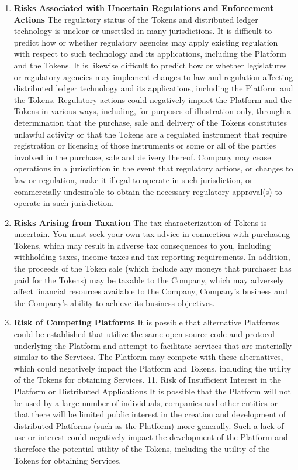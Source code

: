 \begin{enumerate}
    \item \textbf{Risks Associated with Uncertain Regulations and Enforcement Actions}
    The regulatory status of the Tokens and distributed ledger technology is unclear or unsettled in many jurisdictions. It is difficult to predict how or whether regulatory agencies may apply existing regulation with respect to such technology and its applications, including the Platform and the Tokens. It is likewise difficult to predict how or whether legislatures or regulatory agencies may implement changes to law and regulation affecting distributed ledger technology and its applications, including the Platform and the Tokens. Regulatory actions could negatively impact the Platform and the Tokens in various ways, including, for purposes of illustration only, through a determination that the purchase, sale and delivery of the Tokens constitutes unlawful activity or that the Tokens are a regulated instrument that require registration or licensing of those instruments or some or all of the parties involved in the purchase, sale and delivery thereof. Company may cease operations in a jurisdiction in the event that regulatory actions, or changes to law or regulation, make it illegal to operate in such jurisdiction, or commercially undesirable to obtain the necessary regulatory approval(s) to operate in such jurisdiction.
    
    \item \textbf{Risks Arising from Taxation}
    The tax characterization of Tokens is uncertain. You must seek your own tax advice in connection with purchasing Tokens, which may result in adverse tax consequences to you, including withholding taxes, income taxes and tax reporting requirements. In addition, the proceeds of the Token sale (which include any moneys that purchaser has paid for the Tokens) may be taxable to the Company, which may adversely affect financial resources available to the Company, Company’s business and the Company's ability to achieve its business objectives.
    
    \item \textbf{Risk of Competing Platforms}
    It is possible that alternative Platforms could be established that utilize the same open source code and protocol underlying the Platform and attempt to facilitate services that are materially similar to the Services. The Platform may compete with these alternatives, which could negatively impact the Platform and Tokens, including the utility of the Tokens for obtaining Services. 11. Risk of Insufficient Interest in the Platform or Distributed Applications It is possible that the Platform will not be used by a large number of individuals, companies and other entities or that there will be limited public interest in the creation and development of distributed Platforms (such as the Platform) more generally. Such a lack of use or interest could negatively impact the development of the Platform and therefore the potential utility of the Tokens, including the utility of the Tokens for obtaining Services.
    

\end{enumerate}
